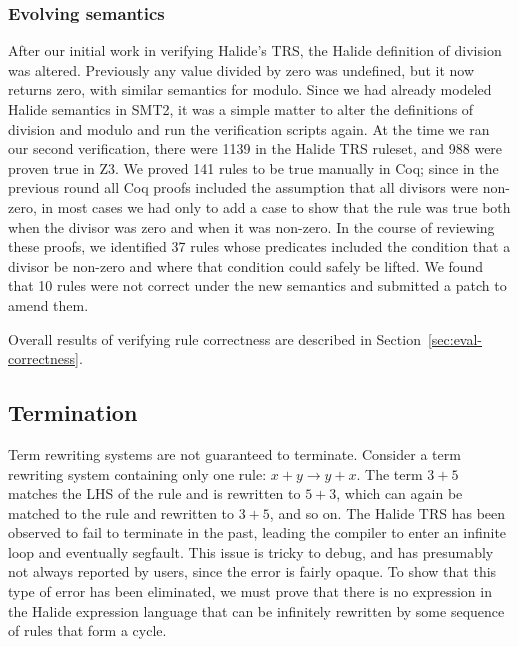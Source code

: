 \documentclass[acmsmall,review,anonymous]{acmart}\settopmatter{printfolios=true,printccs=false,printacmref=false}
\newcommand{\NumZdivRules}{{\color{black} 1139}\xspace}
\newcommand{\NumZdivZThreeProvedRules}{{\color{black} 988}\xspace}
\newcommand{\NumZdivCoqProvedRules}{{\color{black} 141}\xspace}
\newcommand{\NumZdivFalseRules}{{\color{black} 10}\xspace}
\newcommand{\NumZdivRelaxedPredicates}{{\color{black} 37}\xspace}
\begin{document}
\subsubsection{Evolving semantics}

After our initial work in verifying Halide's TRS, the Halide definition of division was altered. Previously any value divided by zero was undefined, but it now returns zero, with similar semantics for modulo. Since we had already modeled Halide semantics in SMT2, it was a simple matter to alter the definitions of division and modulo and run the verification scripts again. At the time we ran our second verification, there were \NumZdivRules in the Halide TRS ruleset, and \NumZdivZThreeProvedRules were proven true in Z3. We proved \NumZdivCoqProvedRules rules to be true manually in Coq; since in the previous round all Coq proofs included the assumption that all divisors were non-zero, in most cases we had only to add a case to show that the rule was true both when the divisor was zero and when it was non-zero. In the course of reviewing these proofs, we identified \NumZdivRelaxedPredicates rules whose predicates included the condition that a divisor be non-zero and where that condition could safely be lifted. We found that \NumZdivFalseRules rules were not correct under the new semantics and submitted a patch to amend them.

Overall results of verifying rule correctness are described in Section~\ref{sec:eval-correctness}.

\subsection{Termination}

Term rewriting systems are not guaranteed to terminate. Consider a term
rewriting system containing only one rule: $x + y \rightarrow y + x$. The term
$3 + 5$ matches the LHS of the rule and is rewritten to $5 + 3$, which can again
be matched to the rule and rewritten to $3 + 5$, and so on. The Halide TRS has been observed to fail to terminate in the past, leading the compiler to enter an infinite loop and eventually segfault. This issue is tricky to debug, and has presumably not always reported by users, since the error is fairly opaque. To show that this type of error has been eliminated, we must prove that there is no expression in the Halide expression language that can be infinitely rewritten by some sequence of rules that form a cycle.
\end{document}

